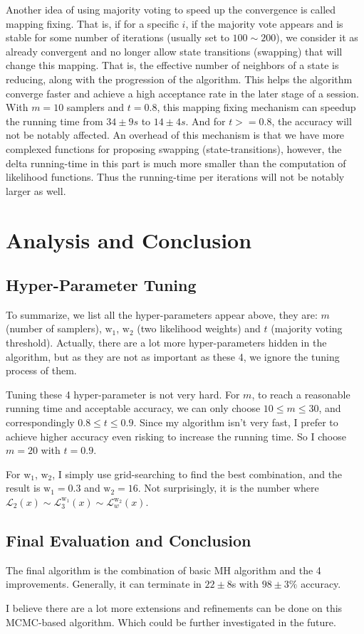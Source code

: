 \documentclass[10pt, twocolumn]{article}
\begin{document}
Another idea of using majority voting to speed up the convergence is called mapping fixing. That is, if for a specific $i$, if the majority vote appears and is stable for some number of iterations (usually set to $100\sim200$), we consider it as already convergent and no longer allow state transitions (swapping) that will change this mapping. That is, the effective number of neighbors of a state is reducing, along with the progression of the algorithm. This helps the algorithm converge faster and achieve a high acceptance rate in the later stage of a session. With $m=10$ samplers and $t=0.8$, this mapping fixing mechanism can speedup the running time from $34\pm9s$ to $14\pm4s$. And for $t>=0.8$, the accuracy will not be notably affected. An overhead of this mechanism is that we have more complexed functions for proposing swapping (state-transitions), however, the delta running-time in this part is much more smaller than the computation of likelihood functions. Thus the running-time per iterations will not be notably larger as well.

\section{\label{sec3} Analysis and Conclusion}
\subsection{\label{subsec3.1}Hyper-Parameter Tuning}
To summarize, we list all the hyper-parameters appear above, they are: $m$ (number of samplers), $\mathrm{w}_1$, $\mathrm{w}_2$ (two likelihood weights) and $t$ (majority voting threshold). Actually, there are a lot more hyper-parameters hidden in the algorithm, but as they are not as important as these 4, we ignore the tuning process of them.

Tuning these 4 hyper-parameter is not very hard. For $m$, to reach a reasonable running time and acceptable accuracy, we can only choose $10\leq m\leq30$, and correspondingly $0.8\leq t \leq 0.9$. Since my algorithm isn't very fast, I prefer to achieve higher accuracy even risking to increase the running time. So I choose $m=20$ with $t=0.9$.

For $\mathrm{w}_1$, $\mathrm{w}_2$, I simply use grid-searching to find the best combination, and the result is $\mathrm{w}_1=0.3$ and $\mathrm{w}_2=16$. Not surprisingly, it is the number where $\mathcal{L}_2(x) \sim \mathcal{L}_3^{\mathrm{w}_1}(x) \sim \mathcal{L}_{w}^{\mathrm{w}_2}(x)$.

\subsection{\label{subsec3.2} Final Evaluation and Conclusion}
The final algorithm is the combination of basic MH algorithm and the 4 improvements. Generally, it can terminate in $22\pm8$s with $98\pm3\%$ accuracy.

I believe there are a lot more extensions and refinements can be done on this MCMC-based algorithm. Which could be further investigated in the future.
\end{document}
